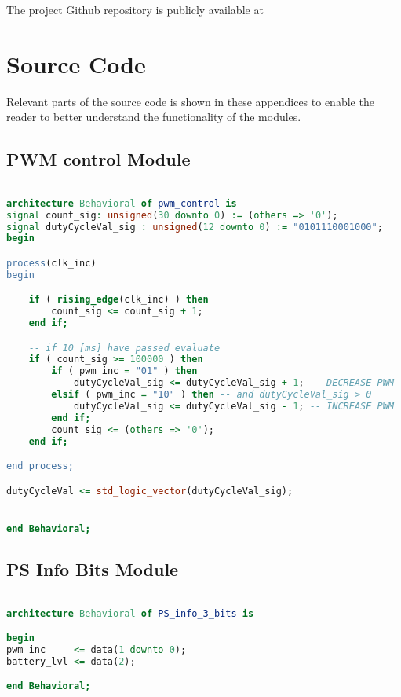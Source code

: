 \documentclass[../report.tex]{subfiles}
\begin{document}
The project Github repository is publicly available at

\section{Source Code}
Relevant parts of the source code is shown in these appendices to enable the reader to better understand the functionality of the modules.

\subsection{PWM control Module}
\begin{lstlisting}[language=VHDL]

architecture Behavioral of pwm_control is
signal count_sig: unsigned(30 downto 0) := (others => '0');
signal dutyCycleVal_sig : unsigned(12 downto 0) := "0101110001000";
begin

process(clk_inc)
begin

    if ( rising_edge(clk_inc) ) then
        count_sig <= count_sig + 1;
    end if;

    -- if 10 [ms] have passed evaluate
    if ( count_sig >= 100000 ) then
        if ( pwm_inc = "01" ) then
            dutyCycleVal_sig <= dutyCycleVal_sig + 1; -- DECREASE PWM
        elsif ( pwm_inc = "10" ) then -- and dutyCycleVal_sig > 0
            dutyCycleVal_sig <= dutyCycleVal_sig - 1; -- INCREASE PWM
        end if;
        count_sig <= (others => '0');
    end if;

end process;

dutyCycleVal <= std_logic_vector(dutyCycleVal_sig);


end Behavioral;

\end{lstlisting}

\subsection{PS Info Bits Module}
\begin{lstlisting}[language=VHDL]

architecture Behavioral of PS_info_3_bits is

begin
pwm_inc     <= data(1 downto 0);
battery_lvl <= data(2);

end Behavioral;

\end{lstlisting}
\end{document}
